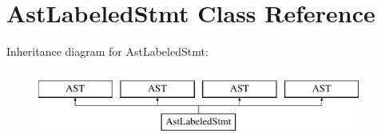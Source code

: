 \hypertarget{classAstLabeledStmt}{\section{Ast\-Labeled\-Stmt Class Reference}
\label{classAstLabeledStmt}
}
Inheritance diagram for Ast\-Labeled\-Stmt\-:\begin{figure}[H]
\begin{center}
\leavevmode
\includegraphics[height=2.000000cm]{classAstLabeledStmt}
\end{center}
\end{figure}
